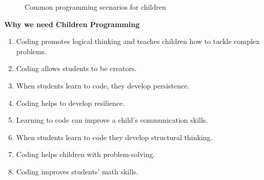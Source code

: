 \documentclass[12pt]{extarticle}
\numberwithin{figure}{section}
\begin{document}
\begin{figure}[ht]
    \centering
    \caption{Common programming scenarios for children}
\end{figure}

\textbf{Why we need Children Programming}

\begin{enumerate}
    \setlength{\itemsep}{0pt}
          \setlength{\parsep}{0pt}
          \setlength{\parskip}{-3mm}
    \item Coding promotes logical thinking and teaches children how to tackle complex problems.\\
    \item Coding allows students to be creators.\\
    \item When students learn to code, they develop persistence.\\
    \item Coding helps to develop resilience.\\
    \item Learning to code can improve a child’s communication skills.\\
    \item When students learn to code they develop structural thinking.\\
    \item Coding helps children with problem-solving.\\
    \item Coding improves students’ math skills.
\end{enumerate}
\end{document}
